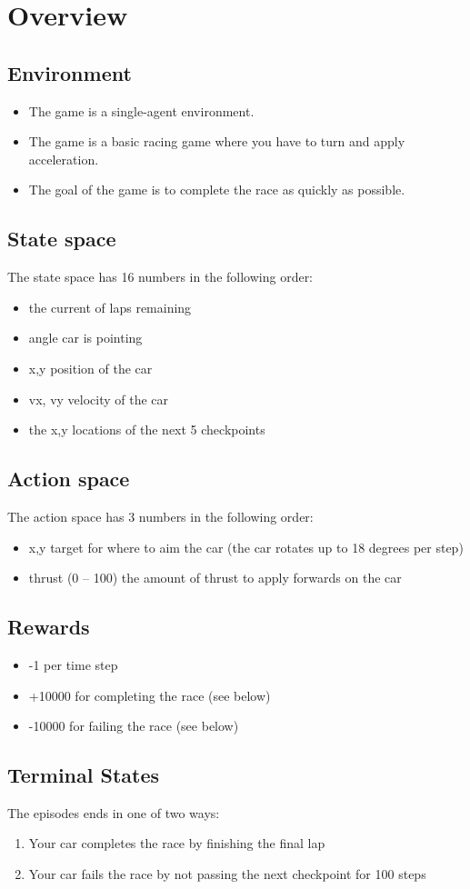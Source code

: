 \documentclass[11pt]{article}
\author{Kevin James}
\date{\today}
\title{}
\begin{document}
\section{Overview}
\label{sec:org873ec9e}
\subsection{Environment}
\label{sec:org7a0e884}
\begin{itemize}
\item The game is a single-agent environment.
\item The game is a basic racing game where you have to turn and apply acceleration.
\item The goal of the game is to complete the race as quickly as possible.
\end{itemize}
\subsection{State space}
\label{sec:orgcf4ab70}
The state space has 16 numbers in the following order:
\begin{itemize}
\item the current of laps remaining
\item angle car is pointing
\item x,y position of the car
\item vx, vy velocity of the car
\item the x,y locations of the next 5 checkpoints
\end{itemize}
\subsection{Action space}
\label{sec:org3bae12d}
The action space has 3 numbers in the following order:
\begin{itemize}
\item x,y target for where to aim the car (the car rotates up to 18 degrees per step)
\item thrust (0 -- 100) the amount of thrust to apply forwards on the car
\end{itemize}
\subsection{Rewards}
\label{sec:org90200e4}
\begin{itemize}
\item -1 per time step
\item +10000 for completing the race (see below)
\item -10000 for failing the race (see below)
\end{itemize}
\subsection{Terminal States}
\label{sec:org4cebb55}
The episodes ends in one of two ways:
\begin{enumerate}
\item Your car completes the race by finishing the final lap
\item Your car fails the race by not passing the next checkpoint for 100 steps
\end{enumerate}
\end{document}

